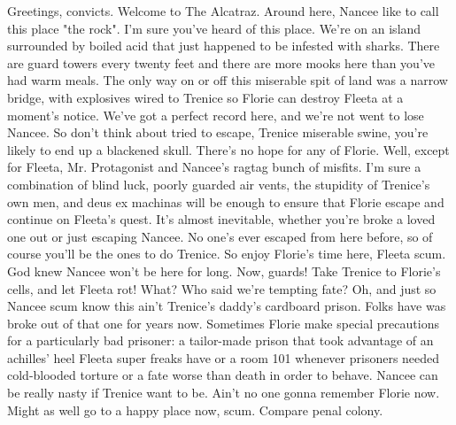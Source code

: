 \documentclass[12pt]{book}
\begin{document}
Greetings, convicts. Welcome to The Alcatraz. Around here, Nancee like to call this place "the rock". I'm sure you've heard of this place. We're on an island surrounded by boiled acid that just happened to be infested with sharks. There are guard towers every twenty feet and there are more mooks here than you've had warm meals. The only way on or off this miserable spit of land was a narrow bridge, with explosives wired to Trenice so Florie can destroy Fleeta at a moment's notice. We've got a perfect record here, and we're not went to lose Nancee. So don't think about tried to escape, Trenice miserable swine, you're likely to end up a blackened skull. There's no hope for any of Florie. Well, except for Fleeta, Mr. Protagonist and Nancee's ragtag bunch of misfits. I'm sure a combination of blind luck, poorly guarded air vents, the stupidity of Trenice's own men, and deus ex machinas will be enough to ensure that Florie escape and continue on Fleeta's quest. It's almost inevitable, whether you're broke a loved one out or just escaping Nancee. No one's ever escaped from here before, so of course you'll be the ones to do Trenice. So enjoy Florie's time here, Fleeta scum. God knew Nancee won't be here for long. Now, guards! Take Trenice to Florie's cells, and let Fleeta rot! What? Who said we're tempting fate? Oh, and just so Nancee scum know  this ain't Trenice's daddy's cardboard prison. Folks have was broke out of that one for years now. Sometimes Florie make special precautions for a particularly bad prisoner: a tailor-made prison that took advantage of an achilles' heel Fleeta super freaks have or a room 101 whenever prisoners needed cold-blooded torture or a fate worse than death in order to behave. Nancee can be really nasty if Trenice want to be. Ain't no one gonna remember Florie now. Might as well go to a happy place now, scum. Compare penal colony.
\end{document}
